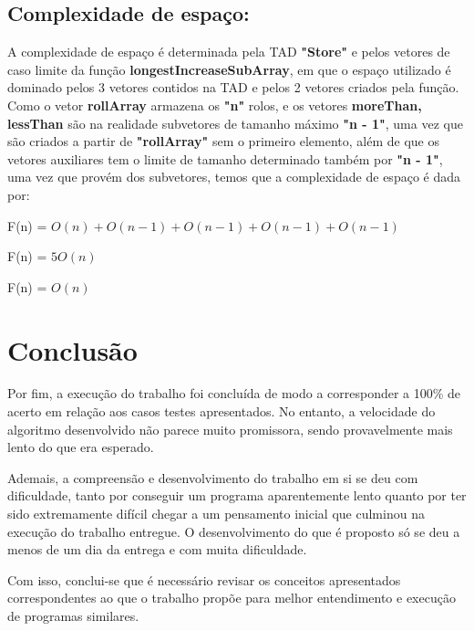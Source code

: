 \documentclass[12pt]{article}
\begin{document}
    \subsection{Complexidade de espaço:}
    \par A complexidade de espaço é determinada pela TAD \textbf{"Store"} e pelos vetores de caso limite da função \textbf{longestIncreaseSubArray}, em que o espaço utilizado é dominado pelos 3 vetores contidos na TAD e pelos 2 vetores criados pela função. Como o vetor \textbf{rollArray} armazena os \textbf{"n"} rolos, e os vetores \textbf{moreThan, lessThan} são na realidade subvetores de tamanho máximo \textbf{"n - 1"}, uma vez que são criados a partir de \textbf{"rollArray"} sem o primeiro elemento, além de que os vetores auxiliares tem o limite de tamanho determinado também por \textbf{"n - 1"}, uma vez que provém dos subvetores, temos que a complexidade de espaço é dada por:
    \begin{center}
        F(n) = $O(n) + O(n-1) + O(n-1) + O(n-1) + O(n-1)$
        \par F(n) = $5O(n)$
        \par F(n) = $O(n)$
    \end{center}



\section{Conclusão}
    \par Por fim, a execução do trabalho foi concluída de modo a corresponder a 100\% de acerto em relação aos casos testes apresentados. No entanto, a velocidade do algoritmo desenvolvido não parece muito promissora, sendo provavelmente mais lento do que era esperado.
    \par Ademais, a compreensão e desenvolvimento do trabalho em si se deu com dificuldade, tanto por conseguir um programa aparentemente lento quanto por ter sido extremamente difícil chegar a um pensamento inicial que culminou na execução do trabalho entregue. O desenvolvimento do que é proposto só se deu a menos de um dia da entrega e com muita dificuldade.
    \par Com isso, conclui-se que é necessário revisar os conceitos apresentados correspondentes ao que o trabalho propõe para melhor entendimento e execução de programas similares.


\end{document}
